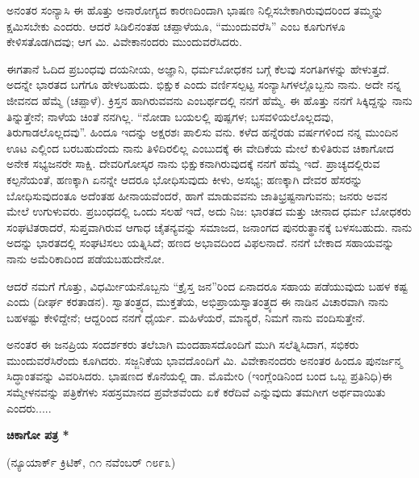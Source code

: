 ಅನಂತರ ಸಂನ್ಯಾಸಿ ಈ ಹೊತ್ತು ಅನಾರೋಗ್ಯದ ಕಾರಣದಿಂದಾಗಿ ಭಾಷಣ ನಿಲ್ಲಿಸಬೇಕಾಗಿರುವುದರಿಂದ ತಮ್ಮನ್ನು ಕ್ಷಮಿಸಬೇಕು ಎಂದರು. ಆದರೆ ಸಿಡಿಲಿನಂತಹ ಚಪ್ಪಾಳೆಯೂ, “ಮುಂದುವರೆಸಿ” ಎಂಬ ಕೂಗುಗಳೂ ಕೇಳಿಸತೊಡಗಿದವು; ಆಗ ಮಿ. ವಿವೇಕಾನಂದರು ಮುಂದುವರೆಸಿದರು.

ಈಗತಾನೆ ಓದಿದ ಪ್ರಬಂಧವು ದಯನೀಯ, ಅಜ್ಞಾನಿ, ಧರ್ಮಬೋಧಕನ ಬಗ್ಗೆ ಕೆಲವು ಸಂಗತಿಗಳನ್ನು ಹೇಳುತ್ತದೆ. ಅದನ್ನೇ ಭಾರತದ ಬಗೆಗೂ ಹೇಳಬಹುದು. ಭಿಕ್ಷುಕ ಎಂದು ವರ್ಣಿಸಲ್ಪಟ್ಟ ಸಂನ್ಯಾಸಿಗಳಲ್ಲೊಬ್ಬನು ನಾನು. ಅದೇ ನನ್ನ ಜೀವನದ ಹೆಮ್ಮೆ (ಚಪ್ಪಾಳೆ). ಕ್ರಿಸ್ತನ ಹಾಗಿರುವವನು ಎಂಬರ್ಥದಲ್ಲಿ ನನಗೆ ಹೆಮ್ಮೆ. ಈ ಹೊತ್ತು ನನಗೆ ಸಿಕ್ಕಿದ್ದನ್ನು ನಾನು ತಿನ್ನುತ್ತೇನೆ; ನಾಳೆಯ ಚಿಂತೆ ನನಗಿಲ್ಲ. “ನೋಡಾ ಬಯಲಲ್ಲಿ ಪುಷ್ಪಗಳ; ಬಸವಳಿಯಲೊಲ್ಲದವು, ತಿರುಗಾಡಲೊಲ್ಲದವು”. ಹಿಂದೂ ಇದನ್ನು ಅಕ್ಷರಶಃ ಪಾಲಿಸು ವನು. ಕಳೆದ ಹನ್ನೆರಡು ವರ್ಷಗಳಿಂದ ನನ್ನ ಮುಂದಿನ ಊಟ ಎಲ್ಲಿಂದ ಬರಬಹುದೆಂದು ನಾನು ತಿಳಿದಿರಲಿಲ್ಲ ಎಂಬುದಕ್ಕೆ ಈ ವೇದಿಕೆಯ ಮೇಲೆ ಕುಳಿತಿರುವ ಚಿಕಾಗೋದ ಅನೇಕ ಸಭ್ಯಜನರೇ ಸಾಕ್ಷಿ. ದೇವರಿಗೋಸ್ಕರ ನಾನು ಭಿಕ್ಷುಕನಾಗಿರುವುದಕ್ಕೆ ನನಗೆ ಹೆಮ್ಮೆ ಇದೆ. ಪ್ರಾಚ್ಯದಲ್ಲಿರುವ ಕಲ್ಪನೆಯಂತೆ, ಹಣಕ್ಕಾಗಿ ಏನನ್ನೇ ಆದರೂ ಭೋಧಿಸುವುದು ಕೀಳು, ಅಸಭ್ಯ; ಹಣಕ್ಕಾಗಿ ದೇವರ ಹೆಸರನ್ನು ಬೋಧಿಸುವುದಂತೂ ಅದೆಂತಹ ಹೀನಾಯವೆಂದರೆ, ಹಾಗೆ ಮಾಡುವವನು ಜಾತಿಭ್ರಷ್ಟನಾಗುವನು; ಜನರು ಅವನ ಮೇಲೆ ಉಗುಳುವರು. ಪ್ರಬಂಧದಲ್ಲಿ ಒಂದು ಸಲಹೆ ಇದೆ, ಅದು ನಿಜ: ಭಾರತದ ಮತ್ತು ಚೀನಾದ ಧರ್ಮ ಬೋಧಕರು ಸಂಘಟಿತರಾದರೆ, ಸುಪ್ತವಾಗಿರುವ ಆಗಾಧ ಚೈತನ್ಯವನ್ನು ಸಮಾಜದ, ಜನಾಂಗದ ಪುನರುತ್ಥಾನಕ್ಕೆ ಬಳಸಬಹುದು. ನಾನು ಅದನ್ನು ಭಾರತದಲ್ಲಿ ಸಂಘಟಿಸಲು ಯತ್ನಿಸಿದೆ; ಹಣದ ಅಭಾವದಿಂದ ವಿಫಲನಾದೆ. ನನಗೆ ಬೇಕಾದ ಸಹಾಯವನ್ನು ನಾನು ಅಮೆರಿಕಾದಿಂದ ಪಡೆಯಬಹುದೇನೋ.

ಆದರೆ ನಮಗೆ ಗೊತ್ತು, ವಿಧರ್ಮೀಯನೊಬ್ಬನು “ಕ್ರೈಸ್ತ ಜನ”ರಿಂದ ಏನಾದರೂ ಸಹಾಯ ಪಡೆಯುವುದು ಬಹಳ ಕಷ್ಟ ಎಂದು (ದೀರ್ಘ ಕರತಾಡನ). ಸ್ವಾತಂತ್ರ್ಯದ, ಮುಕ್ತತೆಯ, ಅಭಿಪ್ರಾಯಸ್ವಾತಂತ್ರ್ಯದ ಈ ನಾಡಿನ ವಿಚಾರವಾಗಿ ನಾನು ಬಹಳಷ್ಟು ಕೇಳಿದ್ದೇನೆ; ಆದ್ದರಿಂದ ನನಗೆ ಧೈರ್ಯ. ಮಹಿಳೆಯರೆ, ಮಾನ್ಯರೆ, ನಿಮಗೆ ನಾನು ವಂದಿಸುತ್ತೇನೆ.

ಅನಂತರ ಈ ಜನಪ್ರಿಯ ಸಂದರ್ಶಕರು ತಲೆಬಾಗಿ ಮಂದಹಾಸದೊಂದಿಗೆ ಮುಗಿ ಸಲೆತ್ನಿಸಿದಾಗ, ಸಭಿಕರು ಮುಂದುವರೆಸಿರೆಂದು ಕೂಗಿದರು. ಸಜ್ಜನಿಕೆಯ ಭಾವದೊಂದಿಗೆ ಮಿ. ವಿವೇಕಾನಂದರು ಅನಂತರ ಹಿಂದೂ ಪುನರ್ಜನ್ಮ ಸಿದ್ಧಾಂತವನ್ನು ವಿವರಿಸಿದರು. ಭಾಷಣದ ಕೊನೆಯಲ್ಲಿ ಡಾ. ಮೊಮೇರಿ (ಇಂಗ್ಲೆಂಡಿನಿಂದ ಬಂದ ಒಬ್ಬ ಪ್ರತಿನಿಧಿ)ಈ ಸಮ್ಮೇಳನವನ್ನು ಪತ್ರಿಕೆಗಳು ಸಹಸ್ರಮಾನದ ಪ್ರವೇಶವೆಂದು ಏಕೆ ಕರೆದಿವೆ ಎನ್ನುವುದು ತಮಗೀಗ ಅರ್ಥವಾಯಿತು ಎಂದರು.....

\begin{center}
\textbf{ಚಿಕಾಗೋ ಪತ್ರ *}
\end{center}

\begin{center}
(ನ್ಯೂಯಾರ್ಕ್ ಕ್ರಿಟಿಕ್, ೧೧ ನವೆಂಬರ್ ೧೮೯೩)
\end{center}

